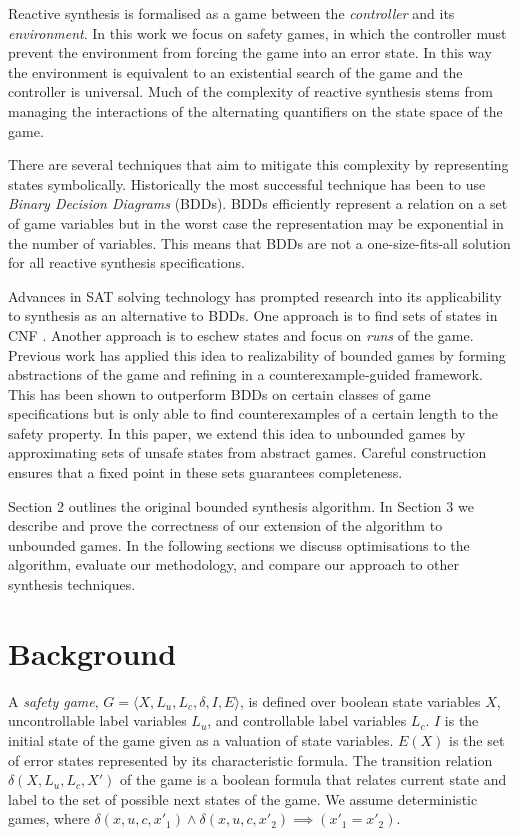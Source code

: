 \documentclass{llncs}
\begin{document}
Reactive synthesis is formalised as a game between the \emph{controller} and
its \emph{environment}. In this work we focus on safety games, in which the
controller must prevent the environment from forcing the game into an error
state. In this way the environment is equivalent to an existential search of
the game and the controller is universal. Much of the complexity of reactive
synthesis stems from managing the interactions of the alternating quantifiers
on the state space of the game.

There are several techniques that aim to mitigate this complexity by
representing states symbolically.  Historically the most successful technique
has been to use \emph{Binary Decision Diagrams} (BDDs).  BDDs efficiently
represent a relation on a set of game variables but in the worst case the
representation may be exponential in the number of variables. This means that
BDDs are not a one-size-fits-all solution for all reactive synthesis
specifications.

Advances in SAT solving technology has prompted research into its applicability
to synthesis as an alternative to BDDs. One approach is to find sets of states
in CNF \cite{bloem2014,morgenstern2013}. Another approach is to eschew states
and focus on \emph{runs} of the game. Previous work has applied this idea to
realizability of bounded games \cite{narodytska2014} by forming abstractions of
the game and refining in a counterexample-guided framework. This has been shown
to outperform BDDs on certain classes of game specifications but is only able
to find counterexamples of a certain length to the safety property.  In this
paper, we extend this idea to unbounded games by approximating sets of unsafe
states from abstract games. Careful construction ensures that a fixed point in
these sets guarantees completeness.

Section 2 outlines the original bounded synthesis algorithm. In Section 3 we
describe and prove the correctness of our extension of the algorithm to
unbounded games. In the following sections we discuss optimisations to the
algorithm, evaluate our methodology, and compare our approach to other
synthesis techniques.

\section{Background}

A \emph{safety game}, $G = \langle X, L_u, L_c, \delta, I, E \rangle$,
is defined over boolean state variables $X$, uncontrollable label variables $L_u$, and
controllable label variables $L_c$.  $I$ is the initial state of the game given as a 
valuation of state variables.  $E(X)$ is the set of error states represented by its 
characteristic formula.  The transition relation $\delta(X, L_u, L_c, X')$ of the game 
is a boolean formula that relates current state and label to the set of possible next 
states of the game.  We assume deterministic games, where 
$\delta(x,u,c,x'_1) \land \delta(x,u,c,x'_2) \implies (x'_1=x'_2)$.
\end{document}
